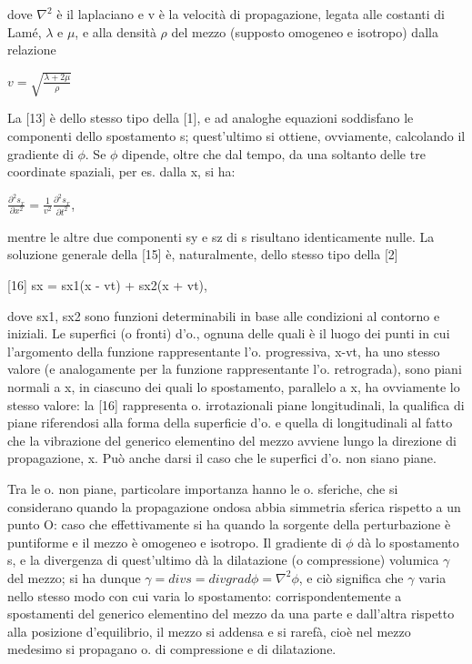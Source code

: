 \documentclass[a4paper]{article}
\begin{document}
dove $\nabla^2$ è il laplaciano e v è la velocità di propagazione, legata alle costanti di Lamé, $\lambda$ e $\mu$, e alla densità $\rho$ del mezzo (supposto omogeneo e isotropo) dalla relazione 

$v=\sqrt{\frac{\lambda+2\mu}{\rho}}$

La [13] è dello stesso tipo della [1], e ad analoghe equazioni soddisfano le componenti dello spostamento s; quest’ultimo si ottiene, ovviamente, calcolando il gradiente di $\phi$. Se $\phi$ dipende, oltre che dal tempo, da una soltanto delle tre coordinate spaziali, per es. dalla x, si ha:

$\frac{\partial^2 s_x}{\partial x^2}=\frac{1}{v^2}\frac{\partial^2 s_x}{\partial t^2}$,

mentre le altre due componenti sy e sz di s risultano identicamente nulle. La soluzione generale della [15] è, naturalmente, dello stesso tipo della [2]

[16] sx = sx1(x - vt) + sx2(x + vt),

dove sx1, sx2 sono funzioni determinabili in base alle condizioni al contorno e iniziali. Le superfici (o fronti) d’o., ognuna delle quali è il luogo dei punti in cui l’argomento della funzione rappresentante l’o. progressiva, x-vt, ha uno stesso valore (e analogamente per la funzione rappresentante l’o. retrograda), sono piani normali a x, in ciascuno dei quali lo spostamento, parallelo a x, ha ovviamente lo stesso valore: la [16] rappresenta o. irrotazionali piane longitudinali, la qualifica di piane riferendosi alla forma della superficie d’o. e quella di longitudinali al fatto che la vibrazione del generico elementino del mezzo avviene lungo la direzione di propagazione, x. Può anche darsi il caso che le superfici d’o. non siano piane.

Tra le o. non piane, particolare importanza hanno le o. sferiche, che si considerano quando la propagazione ondosa abbia simmetria sferica rispetto a un punto O: caso che effettivamente si ha quando la sorgente della perturbazione è puntiforme e il mezzo è omogeneo e isotropo. Il gradiente di $\phi$ dà lo spostamento s, e la divergenza di quest’ultimo dà la dilatazione (o compressione) volumica $\gamma$ del mezzo; si ha dunque $\gamma=div s=div grad \phi=\nabla^2 \phi$, e ciò significa che $\gamma$ varia nello stesso modo con cui varia lo spostamento: corrispondentemente a spostamenti del generico elementino del mezzo da una parte e dall’altra rispetto alla posizione d’equilibrio, il mezzo si addensa e si rarefà, cioè nel mezzo medesimo si propagano o. di compressione e di dilatazione. 
\end{document}

